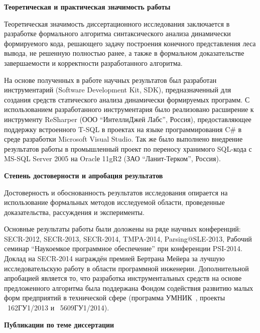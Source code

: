 \textbf{Теоретическая и практическая значимость работы}

Теоретическая значимость диссертационного исследования заключается в разработке формального алгоритма синтаксического анализа динамически формируемого кода, решающего задачу построения конечного представления леса вывода, не решенную полностью ранее, а также в формальном доказательстве завершаемости и корректности разработанного алгоритма. 

На основе полученных в работе научных результатов был разработан инструментарий (Software Development Kit, SDK), предназначенный для создания средств статического анализа динамически формируемых программ. 
С использованием разработанного инструментария было реализовано расширение к инструменту ReSharper (ООО ``ИнтеллиДжей Лабс'', Россия), предоставляющее поддержку встроенного T-SQL в проектах на языке программирования C\# в среде разработки Microsoft Visual Studio. Так же было выполнено внедрение результатов работы в промышленный проект по переносу хранимого SQL-кода с MS-SQL Server 2005 на Oraclе 11gR2 (ЗАО ``Ланит-Терком'', Россия). 

\textbf{Степень достоверности и апробация результатов}

Достоверность и обоснованность результатов исследования опирается на использование формальных методов исследуемой области, проведенные доказательства, рассуждения и эксперименты.

Основные результаты работы были доложены на ряде научных конференций: SECR-2012, SECR-2013, SECR-2014, TMPA-2014, Parsing@SLE-2013, Рабочий семинар ``Наукоемкое программное обеспечение'' при конференции PSI-2014. Доклад на SECR-2014 награждён премией Бертрана Мейера за лучшую исследовательскую работу в области программной инженерии. Дополнительной апробацией является то, что разработка инструментальных средств на основе предложенного алгоритма была поддержана Фондом содействия развитию малых форм предприятий в технической сфере (программа УМНИК~\cite{UMNIC}, проекты \textnumero~162ГУ1/2013 и \textnumero~5609ГУ1/2014).

\textbf{Публикации по теме диссертации}

